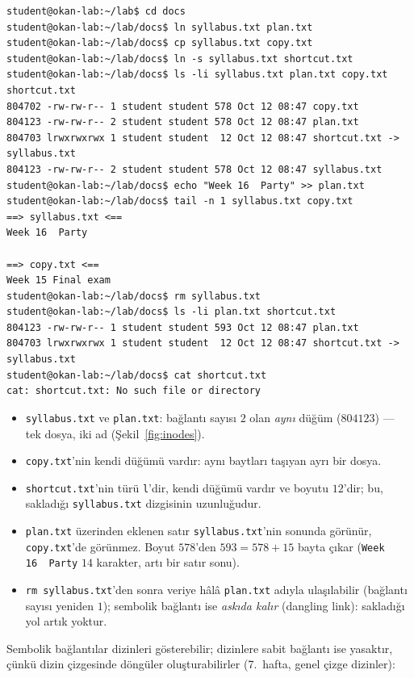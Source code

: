 \documentclass[11pt,a4paper]{article}
\newcommand{\cmd}[1]{\texttt{#1}}
\begin{document}
\begin{lstlisting}[style=term]
student@okan-lab:~/lab$ cd docs
student@okan-lab:~/lab/docs$ ln syllabus.txt plan.txt
student@okan-lab:~/lab/docs$ cp syllabus.txt copy.txt
student@okan-lab:~/lab/docs$ ln -s syllabus.txt shortcut.txt
student@okan-lab:~/lab/docs$ ls -li syllabus.txt plan.txt copy.txt shortcut.txt
804702 -rw-rw-r-- 1 student student 578 Oct 12 08:47 copy.txt
804123 -rw-rw-r-- 2 student student 578 Oct 12 08:47 plan.txt
804703 lrwxrwxrwx 1 student student  12 Oct 12 08:47 shortcut.txt -> syllabus.txt
804123 -rw-rw-r-- 2 student student 578 Oct 12 08:47 syllabus.txt
student@okan-lab:~/lab/docs$ echo "Week 16  Party" >> plan.txt
student@okan-lab:~/lab/docs$ tail -n 1 syllabus.txt copy.txt
==> syllabus.txt <==
Week 16  Party

==> copy.txt <==
Week 15 Final exam
student@okan-lab:~/lab/docs$ rm syllabus.txt
student@okan-lab:~/lab/docs$ ls -li plan.txt shortcut.txt
804123 -rw-rw-r-- 1 student student 593 Oct 12 08:47 plan.txt
804703 lrwxrwxrwx 1 student student  12 Oct 12 08:47 shortcut.txt -> syllabus.txt
student@okan-lab:~/lab/docs$ cat shortcut.txt
cat: shortcut.txt: No such file or directory
\end{lstlisting}

\begin{itemize}
  \item \texttt{syllabus.txt} ve \texttt{plan.txt}: bağlantı sayısı $2$ olan \emph{aynı} düğüm ($804123$) --- tek dosya, iki ad (Şekil~\ref{fig:inodes}).
  \item \texttt{copy.txt}'nin kendi düğümü vardır: aynı baytları taşıyan ayrı bir dosya.
  \item \texttt{shortcut.txt}'nin türü \texttt{l}'dir, kendi düğümü vardır ve boyutu $12$'dir; bu, sakladığı \texttt{syllabus.txt} dizgisinin uzunluğudur.
  \item \texttt{plan.txt} üzerinden eklenen satır \texttt{syllabus.txt}'nin sonunda görünür, \texttt{copy.txt}'de görünmez. Boyut $578$'den $593 = 578 + 15$ bayta çıkar (\texttt{Week 16\ \ Party} $14$ karakter, artı bir satır sonu).
  \item \cmd{rm syllabus.txt}'den sonra veriye hâlâ \texttt{plan.txt} adıyla ulaşılabilir (bağlantı sayısı yeniden $1$); sembolik bağlantı ise \emph{askıda kalır} (dangling link): sakladığı yol artık yoktur.
\end{itemize}

Sembolik bağlantılar dizinleri gösterebilir; dizinlere sabit bağlantı ise yasaktır, çünkü dizin çizgesinde döngüler oluşturabilirler (7.~hafta, genel çizge dizinler):
\end{document}
